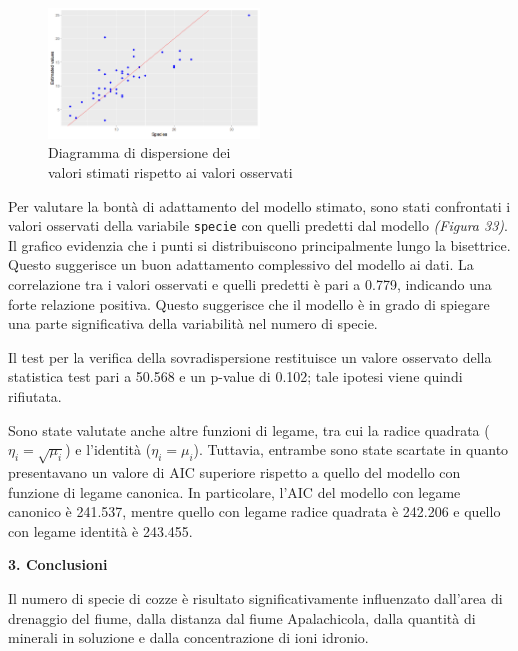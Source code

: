 \documentclass{article} %
\begin{document}
\begin{figure}[H]
    \centering
    \includegraphics[width=0.5\textwidth]{immagini/res_val_oss_glm.png}
    \captionsetup{justification=centering}
    \caption{Diagramma di dispersione dei \\valori stimati rispetto ai valori osservati}
\end{figure}

Per valutare la bontà di adattamento del modello stimato, sono stati confrontati i valori osservati della variabile \texttt{specie} con quelli predetti dal modello \textit{(Figura 33)}. Il grafico evidenzia che i punti si distribuiscono principalmente lungo la bisettrice. Questo suggerisce un buon adattamento complessivo del modello ai dati. La correlazione tra i valori osservati e quelli predetti è pari a 0.779, indicando una forte relazione positiva. Questo suggerisce che il modello è in grado di spiegare una parte significativa della variabilità nel numero di specie.

Il test per la verifica della sovradispersione restituisce un valore osservato della statistica test pari a 50.568 e un p-value di 0.102; tale ipotesi viene quindi rifiutata.  

Sono state valutate anche altre funzioni di legame, tra cui la radice quadrata ($\eta_i=\sqrt{\mu_i}$) e l'identità ($\eta_i=\mu_i$). Tuttavia, entrambe sono state scartate in quanto presentavano un valore di AIC superiore rispetto a quello del modello con funzione di legame canonica. In particolare, l'AIC del modello con legame canonico è 241.537, mentre quello con legame radice quadrata è 242.206 e quello con legame identità è 243.455.

\vskip 70pt
\begin{flushleft}
    \textbf{\Huge 3. \: Conclusioni}
\end{flushleft}
\vskip 10pt

Il numero di specie di cozze è risultato significativamente influenzato dall'area di drenaggio del fiume, dalla distanza dal fiume Apalachicola, dalla quantità di minerali in soluzione e dalla concentrazione di ioni idronio.
\end{document}
